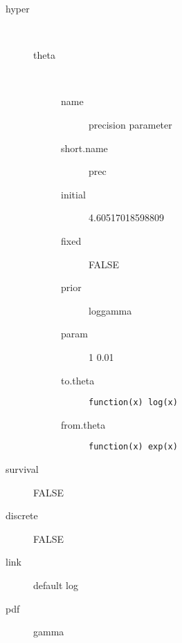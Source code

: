 \begin{description}
	\item[hyper]\ 
	 \begin{description}
	 	\item[theta]\ 
	 	 \begin{description}
	 	 	\item[name] precision parameter
	 	 	\item[short.name] prec
	 	 	\item[initial] 4.60517018598809
	 	 	\item[fixed] FALSE
	 	 	\item[prior] loggamma
	 	 	\item[param] 1 0.01
	 	 	\item[to.theta] \verb|function(x) log(x)|
	 	 	\item[from.theta] \verb|function(x) exp(x)|
	 	 \end{description}
	 \end{description}
	\item[survival] FALSE
	\item[discrete] FALSE
	\item[link] default log
	\item[pdf] gamma
\end{description}
